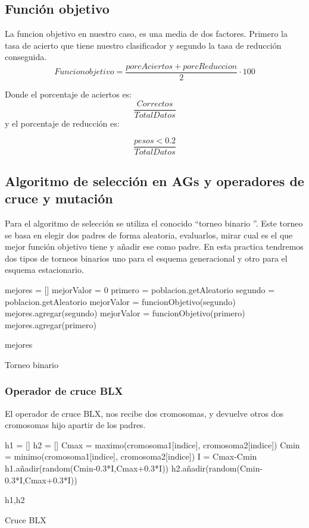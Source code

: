 \documentclass[12pt,a4paper]{article}
\begin{document}
\subsection{Función objetivo}

La funcion objetivo en nuestro caso, es una media de dos factores. Primero la tasa de acierto que tiene nuestro clasificador y segundo la tasa de reducción conseguida. 
$$
Funcion objetivo = \frac{porcAciertos + porcReduccion}{2} \cdot 100
$$

Donde el porcentaje de aciertos es:
$$
 \frac{Correctos}{TotalDatos}
$$
y el porcentaje de reducción es:

$$
\frac{pesos < 0.2}{TotalDatos}
$$
\subsection{Algoritmo de selección en AGs y operadores de cruce y mutación}

Para el algoritmo de selección se utiliza el conocido ``torneo binario ''. Este torneo se basa en elegir dos padres de forma aleatoria, evaluarlos, mirar cual es el que mejor función objetivo tiene y añadir ese como padre. En esta practica tendremos dos tipos de torneos binarios uno para el esquema generacional y otro para el esquema estacionario.
\begin{algorithm}[H]
\begin{algorithmic}[1]
	\State 	mejores = []
	\State 	mejorValor = 0
	\State primero = poblacion.getAleatorio
	\State segundo = poblacion.getAleatorio
	\State mejorValor = funcionObjetivo(segundo)
	\State mejores.agregar(segundo) 
	\Else
	\State mejorValor = funcionObjetivo(primero)
	\State mejores.agregar(primero) 
	\EndIf %
	\EndFor
	
	\State \Return mejores
	
\end{algorithmic}
\label{alg:knn}
\caption{Torneo binario}
\end{algorithm}
\subsubsection{Operador de cruce BLX}
El operador de cruce BLX, nos recibe dos cromosomas, y devuelve otros dos cromosomas hijo apartir de los padres.
\begin{algorithm}[H]
	\begin{algorithmic}[1]
		\State 	h1 = []
		\State 	h2 = []
		\State Cmax = maximo(cromosoma1[indice], cromosoma2[indice])
		\State Cmin = minimo(cromosoma1[indice], cromosoma2[indice])
		\State I = Cmax-Cmin
		\State h1.añadir(random(Cmin-0.3*I,Cmax+0.3*I))
		\State h2.añadir(random(Cmin-0.3*I,Cmax+0.3*I))
		\EndFor
		
		\State \Return h1,h2
		
	\end{algorithmic}
	\label{alg:knn}
	\caption{Cruce BLX}
\end{algorithm}
\end{document}
